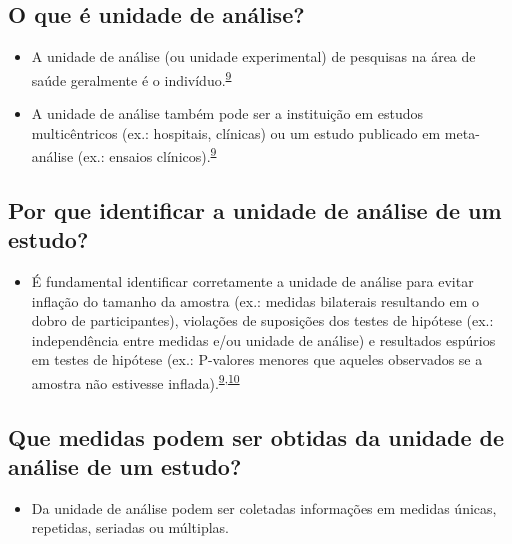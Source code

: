 \documentclass[
  a4paper,
]{book}
\providecommand{\tightlist}{%
  \setlength{\itemsep}{0pt}\setlength{\parskip}{0pt}}
\begin{document}
\hypertarget{o-que-uxe9-unidade-de-anuxe1lise}{%
\subsection{O que é unidade de análise?}\label{o-que-uxe9-unidade-de-anuxe1lise}}

\begin{itemize}
\item
  A unidade de análise (ou unidade experimental) de pesquisas na área de saúde geralmente é o indivíduo.\textsuperscript{\protect\hyperlink{ref-Altman1997}{9}}
\item
  A unidade de análise também pode ser a instituição em estudos multicêntricos (ex.: hospitais, clínicas) ou um estudo publicado em meta-análise (ex.: ensaios clínicos).\textsuperscript{\protect\hyperlink{ref-Altman1997}{9}}
\end{itemize}

\hypertarget{por-que-identificar-a-unidade-de-anuxe1lise-de-um-estudo}{%
\subsection{Por que identificar a unidade de análise de um estudo?}\label{por-que-identificar-a-unidade-de-anuxe1lise-de-um-estudo}}

\begin{itemize}
\tightlist
\item
  É fundamental identificar corretamente a unidade de análise para evitar inflação do tamanho da amostra (ex.: medidas bilaterais resultando em o dobro de participantes), violações de suposições dos testes de hipótese (ex.: independência entre medidas e/ou unidade de análise) e resultados espúrios em testes de hipótese (ex.: P-valores menores que aqueles observados se a amostra não estivesse inflada).\textsuperscript{\protect\hyperlink{ref-Altman1997}{9},\protect\hyperlink{ref-Matthews1990}{10}}
\end{itemize}

\hypertarget{que-medidas-podem-ser-obtidas-da-unidade-de-anuxe1lise-de-um-estudo}{%
\subsection{Que medidas podem ser obtidas da unidade de análise de um estudo?}\label{que-medidas-podem-ser-obtidas-da-unidade-de-anuxe1lise-de-um-estudo}}

\begin{itemize}
\tightlist
\item
  Da unidade de análise podem ser coletadas informações em medidas únicas, repetidas, seriadas ou múltiplas.
\end{itemize}
\end{document}
